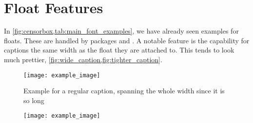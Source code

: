 \chapter{Float Features}
In \cref{fig:censorbox,tab:main_font_examples}, we have already seen examples for floats.
These are handled by packages  and .
A notable feature is the capability for captions the same width as the float they are attached to.
This tends to look much prettier,  \cref{fig:wide_caption,fig:tighter_caption}.
\begin{figure}
\texttt{[image: example\_image]}%
\caption{Example for a regular caption, spanning the whole width since it is so long}%
\label{fig:wide_caption}%
\end{figure}
\begin{figure}
%
{%
	\texttt{[image: example\_image]}%
}%
\end{figure}
